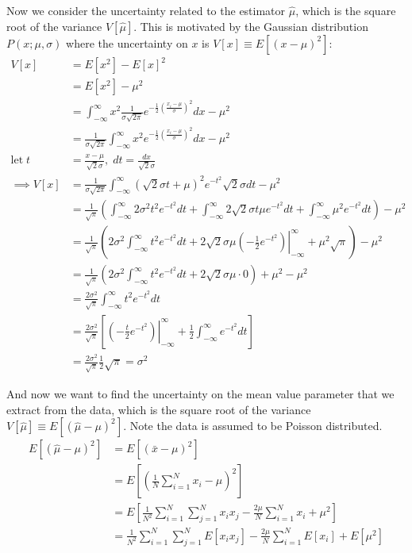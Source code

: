 \documentclass[12pt]{article}
\numberwithin{equation}{section}
\numberwithin{figure}{section}
\numberwithin{table}{section}
\begin{document}
\par Now we consider the uncertainty related to the estimator $\hat\mu$, which is the square root of the variance $V[\hat\mu]$. This is motivated by the Gaussian distribution $P(x;\mu,\sigma)$ where the uncertainty on $x$ is $V[x]\equiv E[(x-\mu)^2]$:
\begin{align*}
    V[x]&=E[x^2]-E[x]^2\\
    &=E[x^2]-\mu^2\\
    &=\int_{-\infty}^\infty x^2 \frac{1}{\sigma \sqrt{2\pi}}e^{-\frac{1}{2}\left(\frac{x_i-\mu}{\sigma}\right)^2} dx -\mu^2\\
    &=\frac{1}{\sigma \sqrt{2\pi}} \int_{-\infty}^\infty x^2 e^{-\frac{1}{2}\left(\frac{x_i-\mu}{\sigma}\right)^2} dx -\mu^2\\
    \text{let}\; t&=\frac{x-\mu}{\sqrt2\sigma},\; dt=\frac{dx}{\sqrt2\sigma}\\
    \implies V[x]&=\frac{1}{\sigma \sqrt{2\pi}} \int_{-\infty}^\infty (\sqrt2\sigma t+\mu)^2e^{-t^2}\sqrt2\sigma dt -\mu^2\\
    &=\frac{1}{\sqrt\pi}\left(\int_{-\infty}^\infty 2\sigma^2t^2e^{-t^2}dt+\int_{-\infty}^\infty 2\sqrt2\sigma t\mu e^{-t^2} dt+\int_{-\infty}^\infty\mu^2e^{-t^2}dt\right)-\mu^2\\
    &=\frac{1}{\sqrt\pi}\left(2\sigma^2\int_{-\infty}^\infty t^2e^{-t^2}dt+2\sqrt2\sigma\mu \left.(-\frac{1}{2}e^{-t^2})\right|_{-\infty}^\infty + \mu^2\sqrt\pi\right)-\mu^2\\
    &=\frac{1}{\sqrt\pi}\left(2\sigma^2\int_{-\infty}^\infty t^2e^{-t^2}dt+2\sqrt2\sigma\mu\cdot0\right)+\mu^2-\mu^2\\
    &=\frac{2\sigma^2}{\sqrt\pi}\int_{-\infty}^\infty t^2e^{-t^2}dt\\
    &=\frac{2\sigma^2}{\sqrt\pi}\left[\left.\left(-\frac{t}{2}e^{-t^2}\right)\right|_{-\infty}^\infty+\frac{1}{2}\int_{-\infty}^\infty e^{-t^2}dt \right]\\
    &=\frac{2\sigma^2}{\sqrt\pi}\frac{1}{2}\sqrt\pi=\sigma^2
\end{align*}
\par And now we want to find the uncertainty on the mean value parameter that we extract from the data, which is the square root of the variance $V[\hat\mu]\equiv E[(\hat\mu-\mu)^2]$. Note the data is assumed to be Poisson distributed.
\begin{align*}
    E\left[(\hat\mu-\mu)^2\right]&=E\left[(\bar{x}-\mu)^2\right]\\
    &=E\left[(\frac{1}{N}\sum_{i=1}^N x_i -\mu)^2\right]\\
    &=E\left[\frac{1}{N^2}\sum_{i=1}^N\sum_{j=1}^N x_ix_j -\frac{2\mu}{N}\sum_{i=1}^Nx_i +\mu^2\right]\\
    &=\frac{1}{N^2}\sum_{i=1}^N\sum_{j=1}^N E[x_ix_j] -\frac{2\mu}{N}\sum_{i=1}^N E[x_i] +E[\mu^2]
\end{align*}
\end{document}

